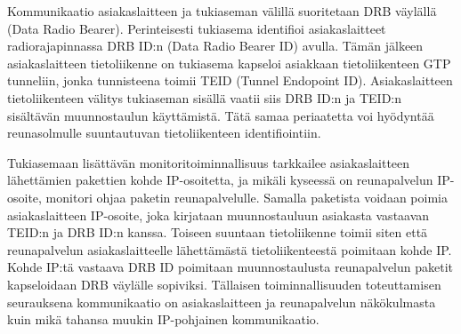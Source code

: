 Kommunikaatio asiakaslaitteen ja tukiaseman välillä suoritetaan DRB väylällä (Data Radio Bearer).
Perinteisesti tukiasema identifioi asiakaslaitteet radiorajapinnassa DRB ID:n (Data Radio Bearer ID) avulla.
Tämän jälkeen asiakaslaitteen tietoliikenne on tukiasema kapseloi asiakkaan tietoliikenteen GTP tunneliin, jonka tunnisteena toimii TEID (Tunnel Endopoint ID).
Asiakaslaitteen tietoliikenteen välitys tukiaseman sisällä vaatii siis DRB ID:n ja TEID:n sisältävän muunnostaulun käyttämistä.
Tätä samaa periaatetta voi hyödyntää reunasolmulle suuntautuvan tietoliikenteen identifiointiin.

Tukiasemaan lisättävän monitoritoiminnallisuus tarkkailee asiakaslaitteen lähettämien pakettien kohde IP-osoitetta, ja mikäli kyseessä on reunapalvelun IP-osoite, monitori ohjaa paketin reunapalvelulle.
Samalla paketista voidaan poimia asiakaslaitteen IP-osoite, joka kirjataan muunnostauluun asiakasta vastaavan TEID:n ja DRB ID:n kanssa.
Toiseen suuntaan tietoliikenne toimii siten että reunapalvelun asiakaslaitteelle lähettämästä tietoliikenteestä poimitaan kohde IP. Kohde IP:tä vastaava DRB ID poimitaan muunnostaulusta reunapalvelun paketit kapseloidaan DRB väylälle sopiviksi.
Tällaisen toiminnallisuuden toteuttamisen seurauksena kommunikaatio on asiakaslaitteen ja reunapalvelun näkökulmasta kuin mikä tahansa muukin IP-pohjainen kommunikaatio.

